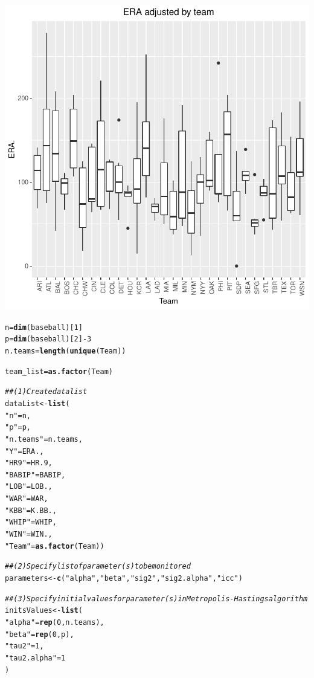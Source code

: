 \documentclass{article}\usepackage[]{graphicx}\usepackage[]{color}
\makeatletter
\newcommand{\hlnum}[1]{\textcolor[rgb]{0.686,0.059,0.569}{#1}}%
\newcommand{\hlstr}[1]{\textcolor[rgb]{0.192,0.494,0.8}{#1}}%
\newcommand{\hlcom}[1]{\textcolor[rgb]{0.678,0.584,0.686}{\textit{#1}}}%
\newcommand{\hlopt}[1]{\textcolor[rgb]{0,0,0}{#1}}%
\newcommand{\hlstd}[1]{\textcolor[rgb]{0.345,0.345,0.345}{#1}}%
\newcommand{\hlkwb}[1]{\textcolor[rgb]{0.69,0.353,0.396}{#1}}%
\newcommand{\hlkwd}[1]{\textcolor[rgb]{0.737,0.353,0.396}{\textbf{#1}}}%
\newenvironment{kframe}{%
 \def\at@end@of@kframe{}%
 \ifinner\ifhmode%
  \def\at@end@of@kframe{\end{minipage}}%
  \begin{minipage}{\columnwidth}%
 \fi\fi%
 \def\FrameCommand##1{\hskip\@totalleftmargin \hskip-\fboxsep
 \colorbox{shadecolor}{##1}\hskip-\fboxsep
     \hskip-\linewidth \hskip-\@totalleftmargin \hskip\columnwidth}%
 \MakeFramed {\advance\hsize-\width
   \@totalleftmargin\z@ \linewidth\hsize
   \@setminipage}}%
 {\par\unskip\endMakeFramed%
 \at@end@of@kframe}
\newenvironment{knitrout}{}{} %
\makeatother
\begin{document}
\begin{knitrout}
{\centering \includegraphics[width=.6\linewidth]{figure/FinalRFile-4350-Rnwauto-report-1} 

}


\begin{kframe}\begin{alltt}
\hlstd{n} \hlkwb{=} \hlkwd{dim}\hlstd{(baseball)[}\hlnum{1}\hlstd{]}
\hlstd{p} \hlkwb{=} \hlkwd{dim}\hlstd{(baseball)[}\hlnum{2}\hlstd{]} \hlopt{-} \hlnum{3}
\hlstd{n.teams} \hlkwb{=} \hlkwd{length}\hlstd{(}\hlkwd{unique}\hlstd{(Team))}

\hlstd{team_list} \hlkwb{=} \hlkwd{as.factor}\hlstd{(Team)}

\hlcom{## (1) Create data list}
\hlstd{dataList} \hlkwb{<-} \hlkwd{list}\hlstd{(}
  \hlstr{"n"} \hlstd{= n,}
  \hlstr{"p"} \hlstd{= p,}
  \hlstr{"n.teams"} \hlstd{= n.teams,}
  \hlstr{"Y"} \hlstd{= ERA.,}
  \hlstr{"HR9"} \hlstd{= HR.9,}
  \hlstr{"BABIP"} \hlstd{= BABIP,}
  \hlstr{"LOB"} \hlstd{= LOB.,}
  \hlstr{"WAR"} \hlstd{= WAR,}
  \hlstr{"KBB"} \hlstd{= K.BB.,}
  \hlstr{"WHIP"} \hlstd{= WHIP,}
  \hlstr{"WIN"} \hlstd{= WIN.,}
  \hlstr{"Team"} \hlstd{=} \hlkwd{as.factor}\hlstd{(Team))}

\hlcom{## (2) Specify list of parameter(s) to be monitored}
\hlstd{parameters} \hlkwb{<-} \hlkwd{c}\hlstd{(}\hlstr{"alpha"}\hlstd{,}\hlstr{"beta"}\hlstd{,}\hlstr{"sig2"}\hlstd{,}\hlstr{"sig2.alpha"}\hlstd{,}\hlstr{"icc"}\hlstd{)}

\hlcom{## (3) Specify initial values for parameter(s) in Metropolis-Hastings algorithm}
\hlstd{initsValues} \hlkwb{<-} \hlkwd{list}\hlstd{(}
  \hlstr{"alpha"} \hlstd{=} \hlkwd{rep}\hlstd{(}\hlnum{0}\hlstd{,n.teams),}
  \hlstr{"beta"} \hlstd{=} \hlkwd{rep}\hlstd{(}\hlnum{0}\hlstd{,p),}
  \hlstr{"tau2"} \hlstd{=} \hlnum{1}\hlstd{,}
  \hlstr{"tau2.alpha"} \hlstd{=} \hlnum{1}
\hlstd{)}


\end{alltt}
\end{kframe}
\end{knitrout}
\end{document}
